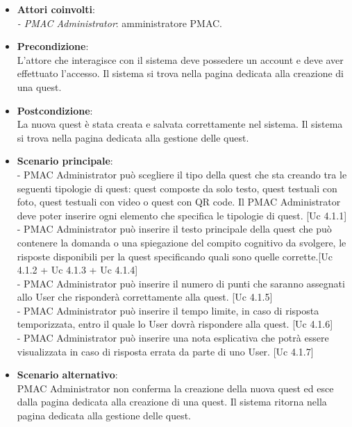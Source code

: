 {\begin{itemize}
\item \textbf{Attori coinvolti}:\\
\emph{- PMAC Administrator}: amministratore PMAC.

\item \textbf{Precondizione}:\\
L'attore che interagisce con il sistema deve possedere un account e deve aver effettuato l'accesso. Il sistema si trova nella pagina dedicata alla creazione di una quest. 

\item \textbf{Postcondizione}:\\
La nuova quest è stata creata e salvata correttamente nel sistema. Il sistema si trova nella pagina dedicata alla gestione delle quest.

\item \textbf{Scenario principale}:\\
- PMAC Administrator può scegliere il tipo della quest che sta creando tra le seguenti tipologie di quest: quest composte da solo testo, quest testuali con foto, quest testuali con video o quest con QR code. Il PMAC Administrator deve poter inserire ogni elemento che specifica le tipologie di quest. [Uc 4.1.1]\\
- PMAC Administrator può inserire il testo principale della quest che può contenere la domanda o una spiegazione del compito cognitivo da svolgere, le risposte disponibili per la quest specificando quali sono quelle corrette.[Uc 4.1.2 + Uc 4.1.3 + Uc 4.1.4]\\
- PMAC Administrator può inserire il numero di punti che saranno assegnati allo User che risponderà correttamente alla quest. [Uc 4.1.5]\\
- PMAC Administrator può inserire il tempo limite, in caso di risposta temporizzata, entro il quale lo User dovrà rispondere alla quest. [Uc 4.1.6]\\
- PMAC Administrator può inserire una nota esplicativa che potrà essere visualizzata in caso di risposta errata da parte di uno User. [Uc 4.1.7]

\item \textbf{Scenario alternativo}:\\
PMAC Administrator non conferma la creazione della nuova quest ed esce dalla pagina dedicata alla creazione di una quest. Il sistema ritorna nella pagina dedicata alla gestione delle quest.
\end{itemize}


}
